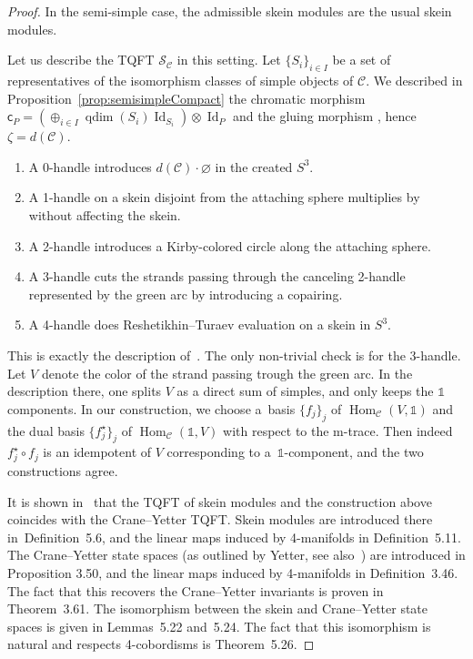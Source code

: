 \documentclass[10pt,a4paper]{amsart}
\numberwithin{equation}{section}
\newcommand{\chr}{{\mathsf{c}}}
\newcommand{\gm}{{\mathsf{g}}}
\numberwithin{theorem}{section}
\numberwithin{proposition}{section}
\numberwithin{definition}{section}
\numberwithin{lemma}{section}
\numberwithin{corollary}{section}
\numberwithin{remark}{section}
\numberwithin{example}{section}
\newcommand{\cat}{\mathcal{C}}
\newcommand{\Hom}{\operatorname{Hom}}
\newcommand{\unit}{\ensuremath{\mathds{1}}}
\newcommand{\Id}{\operatorname{Id}}
\newcommand{\qdim}{\operatorname{qdim}}
\newcommand{\TSkein}{{\mathscr{S}}}
\begin{document}
\begin{proof}
In the semi-simple case, the admissible skein modules are the usual skein modules.

Let us describe the TQFT $\TSkein_\cat$ in this setting. Let $\{S_i\}_{i\in I}$ be a set of representatives of the isomorphism classes of simple objects of $\cat$. We described in Proposition~\ref{prop:semisimpleCompact} the chromatic morphism $\chr_P=(\oplus_{i\in I} \qdim(S_i)\Id_{S_i})\otimes \Id_P$ and the gluing morphism \smash{$\gm=\frac{1}{d(\cat)}\Id_\unit$}, hence $\zeta = d(\cat)$.
\begin{enumerate}\itemsep=0pt
\item[0.] A 0-handle introduces $d(\cat)\cdot\varnothing$ in the created $S^3$.
\item[1.] A 1-handle on a skein disjoint from the attaching sphere multiplies by \smash{$\frac{1}{d(\cat)}$} without affecting the skein.
\item[2.] A 2-handle introduces a Kirby-colored circle along the attaching sphere.
\item[3.] A 3-handle cuts the strands passing through the canceling 2-handle represented by the green arc by introducing a copairing.
\item[4.] A 4-handle does Reshetikhin--Turaev evaluation on a skein in $S^3$.
\end{enumerate}
This is exactly the description of~\cite[Definition~5.11]{Tham21}. The only non-trivial check is for the 3-handle. Let $V$ denote the color of the strand passing trough the green arc. In the description there, one splits $V$ as a direct sum of simples, and only keeps the $\unit$ components. In our construction, we choose a~basis $\{f_j\}_j$ of $\Hom_\cat(V,\unit)$ and the dual basis $\bigl\{f_j^\star\bigr\}_j$ of $\Hom_\cat(\unit,V)$ with respect to the
m-trace.
Then indeed $f_j^\star\circ f_j$ is an idempotent of $V$ corresponding to a~$\unit$-component, and the two constructions agree.

It is shown in~\cite[Sections 5.2 and 3.4]{Tham21} that the TQFT of skein modules and the construction above coincides with the Crane--Yetter TQFT. Skein modules are introduced there in~Definition~5.6, and the linear maps induced by 4-manifolds in Definition~5.11. The Crane--Yetter state spaces (as outlined by Yetter, see also~\cite[Section 7.1]{BB18}) are introduced in Proposition 3.50, and the linear maps induced by 4-manifolds in Definition~3.46. The fact that this recovers the Crane--Yetter invariants is proven in Theorem~3.61. The isomorphism between the skein and Crane--Yetter state spaces is given in Lemmas~5.22 and~5.24. The fact that this isomorphism is natural and respects 4-cobordisms is Theorem~5.26.
\end{proof}
\end{document}
